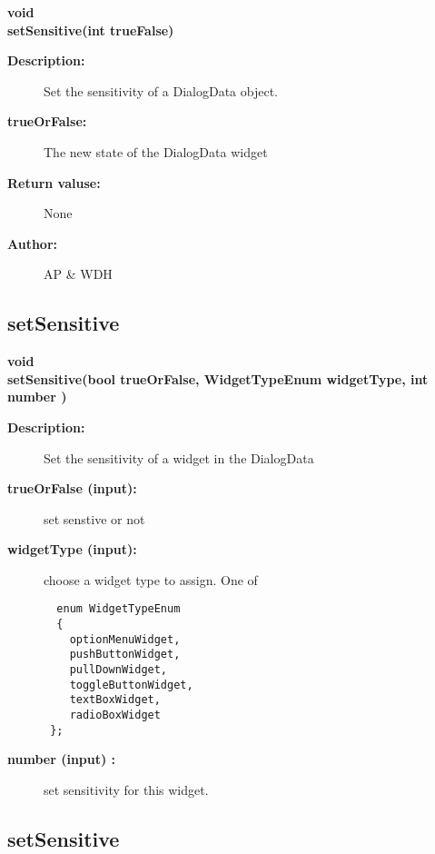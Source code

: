 \begin{flushleft} \textbf{%
void  \\ 
\settowidth{\DialogDataIncludeArgIndent}{setSensitive(}%
setSensitive(int trueFalse)
}\end{flushleft}
\begin{description}
\item[{\bf Description:}]  Set the sensitivity of a DialogData object.
\item[{\bf trueOrFalse:}]  The new state of the DialogData widget
\item[{\bf Return valuse:}]  None
\item[{\bf Author:}]  AP \& WDH
\end{description}
\subsection{setSensitive}
 
\begin{flushleft} \textbf{%
void  \\ 
\settowidth{\DialogDataIncludeArgIndent}{setSensitive(}%
setSensitive(bool trueOrFalse, WidgetTypeEnum widgetType, int number )
}\end{flushleft}
\begin{description}
\item[{\bf Description:}] 
    Set the sensitivity of a widget in the DialogData
\item[{\bf trueOrFalse (input):}]  set senstive or not
\item[{\bf widgetType (input):}]  choose a widget type to assign. One of 
 \begin{verbatim}
  enum WidgetTypeEnum  
  {
    optionMenuWidget,
    pushButtonWidget,
    pullDownWidget,
    toggleButtonWidget,
    textBoxWidget,
    radioBoxWidget
 };
 \end{verbatim}
\item[{\bf number (input) :}]  set sensitivity for this widget. 
\end{description}
\subsection{setSensitive}
 

